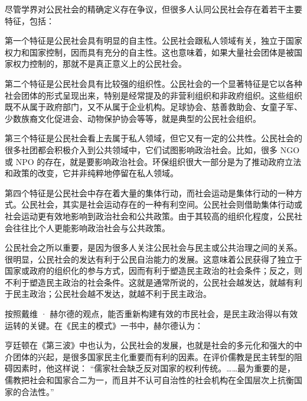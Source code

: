 尽管学界对公民社会的精确定义存在争议，但很多人认同公民社会存在着若干主要特征，包括：

第一个特征是公民社会具有明显的自主性。公民社会跟私人领域有关，独立于国家权力和国家控制，因而具有充分的自主性。这也意味着，如果大量社会团体是被国家权力控制的，那就不是真正意义上的公民社会。

第二个特征是公民社会具有比较强的组织性。公民社会的一个显著特征是它以各种社会团体的形式呈现出来，特别是经常提及的非营利组织和非政府组织。这些组织既不从属于政府部门，又不从属于企业机构。足球协会、慈善救助会、女童子军、少数族裔文化促进会、动物保护协会等等，就是典型的公民社会组织。

第三个特征是公民社会看上去属于私人领域，但它又有一定的公共性。公民社会的很多社团都会积极介入到公共领域中，它们试图影响政治社会。比如，很多 NGO 或 NPO 的存在，就是要影响政治社会。环保组织很大一部分是为了推动政府立法和政策的改变，它并非纯粹地停留在私人领域。

第四个特征是公民社会中存在着大量的集体行动，而社会运动是集体行动的一种方式。公民社会，其实是社会运动存在的一种有利空间。公民社会则借助集体行动或社会运动更有效地影响到政治社会和公共政策。由于其较高的组织化程度，公民社会往往比个人更能影响政治社会与公共政策。

公民社会之所以重要，是因为很多人关注公民社会与民主或公共治理之间的关系。很明显，公民社会的发达有利于公民自治能力的发展。这意味着公民获得了独立于国家或政府的组织化的参与方式，因而有利于塑造民主政治的社会条件；反之，则不利于塑造民主政治的社会条件。这就是通常所说的，公民社会越发达，就越有利于民主政治；公民社会越不发达，就越不利于民主政治。

按照戴维 · 赫尔德的观点，能否重新构建有效的市民社会，是民主政治得以有效运转的关键。在《民主的模式》一书中，赫尔德认为：


亨廷顿在《第三波》中也认为，公民社会的发展，也就是社会的多元化和强大的中介团体的兴起，是很多国家民主化重要而有利的因素。在评价儒教是民主转型的阻碍因素时，他这样说： “儒家社会缺乏反对国家的权利传统。……最为重要的是，儒教把社会和国家合二为一，而且并不认可自治性的社会机构在全国层次上抗衡国家的合法性。” 

